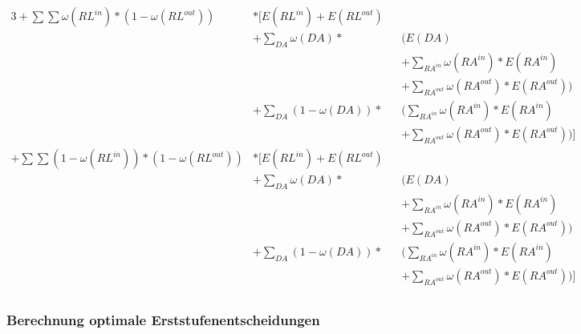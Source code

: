 \begin{alignat*}{3}
	+\sum \sum \omega(RL^{in})* (1-\omega(RL^{out}))     & * \Biggl[E(RL^{in}) + E(RL^{out})                                                                       \\
	                                                     & +\sum_{DA} \omega(DA) *           &  & \Biggl(E(DA)                                                     \\
	                                                     &                                   &  & + \sum_{RA^{in}} \omega(RA^{in}) * E(RA^{in})                    \\
	                                                     &                                   &  & + \sum_{RA^{out}} \omega(RA^{out}) * E(RA^{out})\Biggr)          \\
	                                                     & +\sum_{DA} (1- \omega(DA)) *      &  & \Biggl(\sum_{RA^{in}} \omega(RA^{in}) * E(RA^{in})               \\
	                                                     &                                   &  & + \sum_{RA^{out}} \omega(RA^{out}) * E(RA^{out})\Biggr) \Biggr]  \\
	+\sum \sum (1-\omega(RL^{in}))* (1-\omega(RL^{out})) & * \Biggl[E(RL^{in}) + E(RL^{out})                                                                       \\
	                                                     & +\sum_{DA} \omega(DA) *           &  & \Biggl(E(DA)                                                     \\
	                                                     &                                   &  & + \sum_{RA^{in}} \omega(RA^{in}) * E(RA^{in})                    \\
	                                                     &                                   &  & + \sum_{RA^{out}} \omega(RA^{out}) * E(RA^{out})\Biggr)          \\
	                                                     & +\sum_{DA} (1- \omega(DA)) *      &  & \Biggl(\sum_{RA^{in}}\omega(RA^{in}) * E(RA^{in})                \\
	                                                     &                                   &  & + \sum_{RA^{out}} \omega (RA^{out}) * E(RA^{out})\Biggr) \Biggr] \\
\end{alignat*}

\subsubsection{Berechnung optimale Erststufenentscheidungen}

